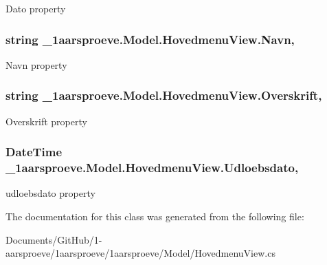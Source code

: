 Dato property 

\hypertarget{class__1aarsproeve_1_1_model_1_1_hovedmenu_view_ad5ddaea59224b5244b2c83113b94d27e}{}
\subsubsection[{Navn}]{\setlength{\rightskip}{0pt plus 5cm}string \+\_\+1aarsproeve.\+Model.\+Hovedmenu\+View.\+Navn\hspace{0.3cm}{\ttfamily [get]}, {\ttfamily [set]}}\label{class__1aarsproeve_1_1_model_1_1_hovedmenu_view_ad5ddaea59224b5244b2c83113b94d27e}


Navn property 

\hypertarget{class__1aarsproeve_1_1_model_1_1_hovedmenu_view_ad8cb4e03fe1a8382191d1e92a15512d3}{}
\subsubsection[{Overskrift}]{\setlength{\rightskip}{0pt plus 5cm}string \+\_\+1aarsproeve.\+Model.\+Hovedmenu\+View.\+Overskrift\hspace{0.3cm}{\ttfamily [get]}, {\ttfamily [set]}}\label{class__1aarsproeve_1_1_model_1_1_hovedmenu_view_ad8cb4e03fe1a8382191d1e92a15512d3}


Overskrift property 

\hypertarget{class__1aarsproeve_1_1_model_1_1_hovedmenu_view_af10dad34551f6ab6cbc31d012006bfab}{}
\subsubsection[{Udloebsdato}]{\setlength{\rightskip}{0pt plus 5cm}Date\+Time \+\_\+1aarsproeve.\+Model.\+Hovedmenu\+View.\+Udloebsdato\hspace{0.3cm}{\ttfamily [get]}, {\ttfamily [set]}}\label{class__1aarsproeve_1_1_model_1_1_hovedmenu_view_af10dad34551f6ab6cbc31d012006bfab}


udloebsdato property 



The documentation for this class was generated from the following file\+:\begin{DoxyCompactItemize}
\item 
Documents/\+Git\+Hub/1-\/aarsproeve/1aarsproeve/1aarsproeve/\+Model/Hovedmenu\+View.\+cs\end{DoxyCompactItemize}
